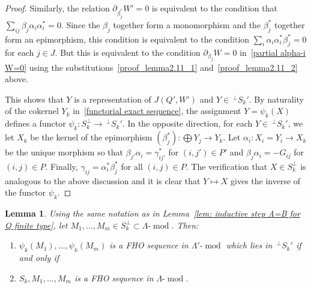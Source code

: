 \documentclass[10pt]{amsart}
\newtheorem{lemm}[theo]{Lemma}
\theoremstyle{definition}
\DeclareMathOperator{\modr}{mod}
\begin{document}
\begin{proof}
Similarly, the relation $\partial_{\beta_j^\ast}W'=0$ is equivalent to the condition that $\sum_{ij} \beta_j\alpha_i\alpha_i^\ast=0$. Since the $\beta_j$ together form a monomorphism and the $\beta_j^\ast$ together form an epimorphism, this condition is equivalent to the condition $\sum_i \alpha_i\alpha_i^\ast\beta_j^\ast=0$ for each $j\in J$. But this is equivalent to the condition $\partial_{\beta_j}W=0$ in~\eqref{partial alpha-i W=0} using the substitutions~\eqref{proof_lemma2.11_1}  and~\eqref{proof_lemma2.11_2} above.

This shows that $Y$ is a representation of $J(Q',W')$ and $Y\in \,^{\perp}S_k'$. By naturality of the cokernel $Y_k$ in~\eqref{functorial exact sequence}, the assignment $Y=\psi_k(X)$ defines a functor $\psi_k:S_k^\perp\to \,^{\perp}S_k'$. In the opposite direction, for each $Y\in\,^{\perp}S_k'$, we let $X_k$ be the kernel of the epimorphism $(\beta_j^\ast):\bigoplus Y_j\to Y_k$. Let $\alpha_i:X_i=Y_i\to X_k$ be the unique morphism so that $\beta_{j'}\alpha_i=\gamma_{ij'}^\ast$ for $(i,j')\in P'$ and $\beta_j\alpha_i=-G_{ij}$ for $(i,j)\in P$. Finally, $\gamma_{ij}=\alpha_i^\ast\beta_j^\ast$ for all $(i,j)\in P$. The verification that $X\in S_k^\perp$ is analogous to the above discussion and it is clear that $Y\mapsto X$ gives the inverse of the functor $\psi_k$.
\end{proof}



\begin{lemm}\label{lem: rotation lemma for modules}
Using the same notation as in Lemma~\ref{lem: inductive step A=B for Q finite type}, let $M_1,\ldots,M_m\in S_k^\perp\subset \Lambda\text{-}\modr $. Then: 
\begin{enumerate}
\item\label{lemma2.12_1} %
$\psi_k(M_1),\ldots,\psi_k(M_m)$ is a FHO sequence in $\Lambda'\text{-}\modr $ which lies in $\,^{\perp}S_k'$ if and only if 
\item\label{lemma2.12_2} %
$S_k,M_1,\ldots,M_m$ is a FHO sequence in $\Lambda\text{-}\modr $.
\end{enumerate}
\end{lemm}
\end{document}
